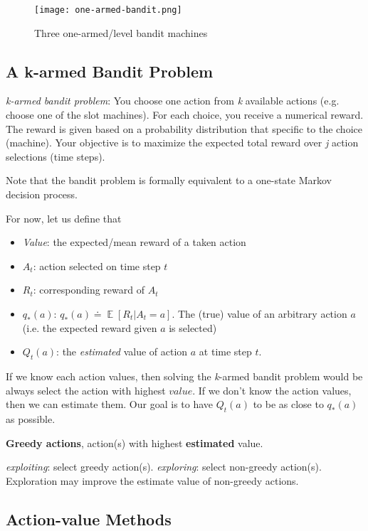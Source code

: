 \documentclass[lang=en,mode=geye,device=normal,color=blue,14pt]{elegantnote}
\DeclareMathOperator*{\E}{\mathbb{E}}
\DeclareMathOperator*{\1}{\mathbbm{1}}
\begin{document}
\begin{figure}[!h]
  \texttt{[image: one-armed-bandit.png]}
  \caption{Three one-armed/level bandit machines}
  \label{fig:bandit-machine}
\end{figure}

\subsection{A k-armed Bandit Problem}

\textit{k-armed bandit problem}:
You choose one action from \textit{k} available actions (e.g. choose one of the slot machines). For each choice, you receive a numerical reward. The reward is given based on a probability distribution that specific to the choice (machine). Your objective is to maximize the expected total reward over \textit{j} action selections (time steps).

Note that the bandit problem is formally equivalent to a one-state Markov decision process. 

For now, let us define that
\begin{itemize}
\item \textit{Value}: the expected/mean reward of a taken action
\item $A_t$: action selected on time step $t$
\item $R_t$: corresponding reward of $A_t$
\item $q_{*}(a)$:  $q_{*}(a) \doteq \E[R_t|A_t=a]$. The (true) value of an arbitrary action $a$ (i.e. the expected reward given $a$ is selected)
\item $Q_t(a)$: the \textit{estimated} value of action $a$ at time step $t$.
\end{itemize}

If we know each action values, then solving the \textit{k}-armed bandit problem would be always select the action with highest $value$.
If we don't know the action values, then we can estimate them.
Our goal is to have $Q_t(a)$ to be as close to $q_*(a)$ as possible.

\begin{definition}
\textbf{Greedy actions}, action(s) with highest \textbf{estimated} value.
\end{definition}
\textit{exploiting}: select greedy action(s).
\textit{exploring}: select non-greedy action(s). Exploration may improve the estimate value of non-greedy actions.

\subsection{Action-value Methods}
\end{document}
